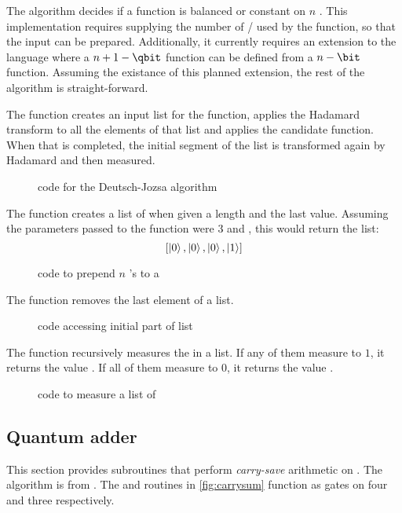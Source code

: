 The algorithm decides if a function is balanced or constant on 
$n$ \bits. This implementation requires supplying the number of
\bits{} / \qbits{} used by the function, so that the input can 
be prepared. Additionally, it currently requires an extension to the 
language where a $n+1-\qbit$ function can be defined from
a $n-\bit$ function. Assuming the existance of this planned extension,
the rest of the algorithm is straight-forward.

The function  creates an input list for the function, 
applies the Hadamard transform to all the elements of that list
and  applies
the candidate function. When that is completed, the initial segment
of the list is transformed again by Hadamard and then measured. 


\begin{figure}[htbp]

\caption{\lqpl{} code for the Deutsch-Jozsa algorithm}\label{fig:dj}
\end{figure}

The function  creates a list of \qbits{} when given
a length and the last value. Assuming the parameters passed to the 
function were $3$ and , this would return the list:
\[[\left\vert{0}\right\rangle,\left\vert{0}\right\rangle,\left\vert{0}\right\rangle,\left\vert{1}\right\rangle]\]
\begin{figure}[htbp]

\caption{\lqpl{} code to prepend $n$ 's to a \qbit}\label{fig:addnzerps}
\end{figure}

The  function removes the last element of a list.
\begin{figure}[htbp]

\caption{\lqpl{} code accessing initial part of list}\label{fig:initlist}
\end{figure}

The  function recursively measures the 
\qbits{} in a list. If any of them measure to $1$, it returns the 
value . If all of them measure to $0$, it returns
the value .

\begin{figure}[htbp]

\caption{\lqpl{} code to measure a list of  \qbits}\label{fig:measureinps}
\end{figure}

\subsection{Quantum adder}\label{appsubsec:quantumadder}
This section provides subroutines that perform \emph{carry-save}
arithmetic on \qbits{}. The algorithm is from
\cite{Vedral:1995ga}. The  and 
routines in \vref{fig:carrysum} function as gates on four \qbits{}
and three \qbits{} respectively.


